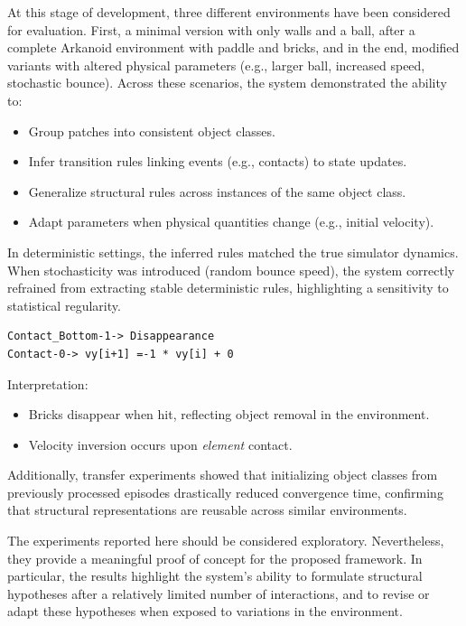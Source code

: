 \documentclass[12pt,a4paper]{report}
\begin{document}
At this stage of development, three different environments have been considered for evaluation. First, a minimal version with only walls and a ball, after a complete Arkanoid environment with paddle and bricks, and in the end, modified variants with altered physical parameters (e.g., larger ball, increased speed, stochastic bounce).
Across these scenarios, the system demonstrated the ability to:

\begin{itemize}
    
    \item Group patches into consistent object classes.
    \item Infer transition rules linking events (e.g., contacts) to state updates.
    \item Generalize structural rules across instances of the same object class.
    \item Adapt parameters when physical quantities change (e.g., initial velocity).

\end{itemize}
In deterministic settings, the inferred rules matched the true simulator dynamics. When stochasticity was introduced (random bounce speed), the system correctly refrained from extracting stable deterministic rules, highlighting a sensitivity to statistical regularity.

\begin{center}
\begin{minipage}{0.8\textwidth}
\begin{verbatim}
Contact_Bottom-1-> Disappearance
Contact-0-> vy[i+1] =-1 * vy[i] + 0
\end{verbatim}
\end{minipage}
\end{center}

\noindent Interpretation:
\begin{itemize}
    \item Bricks disappear when hit, reflecting object removal in the environment.
    \item Velocity inversion occurs upon \textit{element} contact.
\end{itemize}
Additionally, transfer experiments showed that initializing object classes from previously processed episodes drastically reduced convergence time, confirming that structural representations are reusable across similar environments.

The experiments reported here should be considered exploratory. Nevertheless, they provide a meaningful proof of concept for the proposed framework. In particular, the results highlight the system's ability to formulate structural hypotheses after a relatively limited number of interactions, and to revise or adapt these hypotheses when exposed to variations in the environment.
\end{document}
